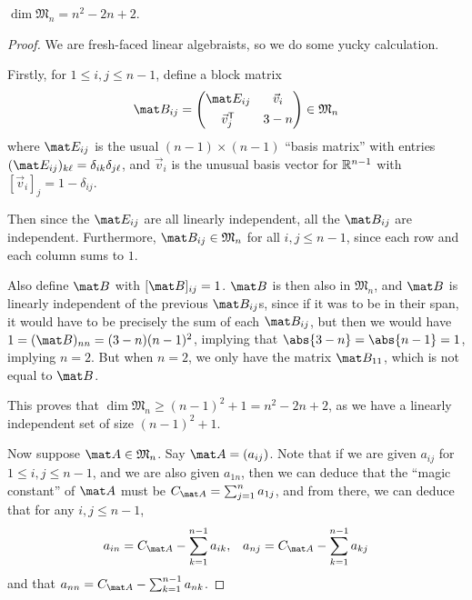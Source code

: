 \documentclass[a4paper,12pt]{article}
\begin{document}
\begin{theorem}
 \(\dim \mathfrak M_n = n^2 - 2n + 2\).
\end{theorem}
\begin{proof}
 We are fresh-faced linear algebraists, so we do some yucky calculation.

 Firstly, for \(1 \le i, j \le n - 1\), define a block matrix
 \begin{equation*}
  \mat B_{ij} =
  \begin{pmatrix}
   \mat E_{ij} & \vec v_i \\[1ex]
   \tran{\vec v_j} & 3 - n
  \end{pmatrix} \in \mathfrak M_n
 \end{equation*}
 where \(\mat E_{ij}\) is the usual \((n - 1) \times (n - 1)\) ``basis matrix''
 with entries \((\mat E_{ij})_{k\ell} = \delta_{ik} \delta_{j\ell}\), and
 \(\vec v_i\) is the unusual basis vector for \(\mathbb R^{n - 1}\) with
 \([\vec v_i]_j = 1 - \delta_{ij}\).

 Then since the \(\mat E_{ij}\) are all linearly independent, all the
 \(\mat B_{ij}\) are independent. Furthermore, \(\mat B_{ij} \in \mathfrak M_n\)
 for all \(i, j \le n - 1\), since each row and each column sums to \(1\).

 Also define \(\mat B\) with \([\mat B]_{ij} = 1\). \(\mat B\) is then also in
 \(\mathfrak M_n\), and \(\mat B\) is linearly independent of the previous
 \(\mat B_{ij}\)s, since if it was to be in their span, it would have to be
 precisely the sum of each \(\mat B_{ij}\), but then we would have
 \(1 = (\mat B)_{nn} = (3 - n)(n - 1)^2\), implying that
 \(\abs{3 - n} = \abs{n - 1} = 1\), implying \(n = 2\). But when \(n = 2\), we
 only have the matrix \(\mat B_{11}\), which is not equal to \(\mat B\).

 This proves that \(\dim \mathfrak M_n \ge (n - 1)^2 + 1 = n^2 - 2n + 2\), as we
 have a linearly independent set of size \((n - 1)^2 + 1\).

 Now suppose \(\mat A \in \mathfrak M_n\). Say \(\mat A = (a_{ij})\). Note that
 if we are given \(a_{ij}\) for \(1 \le i, j \le n - 1\), and we are also given
 \(a_{1n}\), then we can deduce that the ``magic constant'' of \(\mat A\) must
 be \(C_{\mat A} = \sum_{j = 1}^n a_{1j}\), and from there, we can deduce that
 for any \(i, j \le n - 1\),
 \begin{align*}
  a_{in} = C_{\mat A} - \sum_{k = 1}^{n - 1} a_{ik}, &&
  a_{nj} = C_{\mat A} - \sum_{k = 1}^{n - 1} a_{kj}
 \end{align*}
 and that \(a_{nn} = C_{\mat A} - \sum_{k = 1}^{n - 1} a_{nk}\).


\end{proof}
\end{document}
